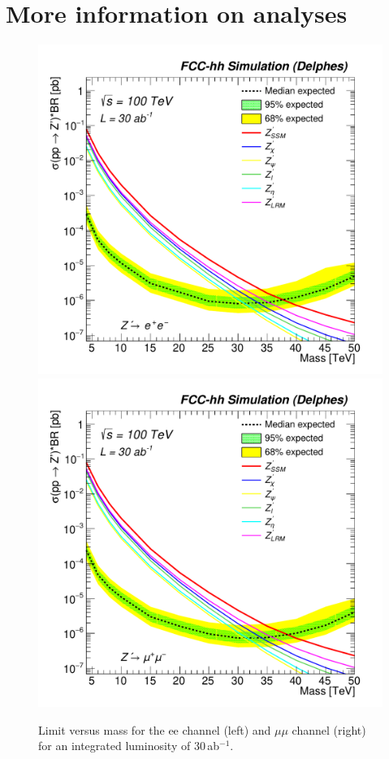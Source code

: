 \documentclass[a4paper,11pt]{article}
\begin{document}
\section{More information on analyses}
\label{app:anamore}
\begin{figure}[!htb]
  \centering
  \includegraphics[width=0.35\columnwidth]{Fig/lim_Zprime_ee_fcc_v02_allxs-eps-converted-to.pdf}
  \includegraphics[width=0.35\columnwidth]{Fig/lim_Zprime_mumu_fcc_v02_allxs-eps-converted-to.pdf}
  \caption{Limit versus mass for the ee channel (left) and $\mu\mu$ channel (right) for an integrated luminosity of $30$\,ab$^{-1}$. }
  \label{figure:leptonicresonances:resultseemumu}
\end{figure}


\end{document}
